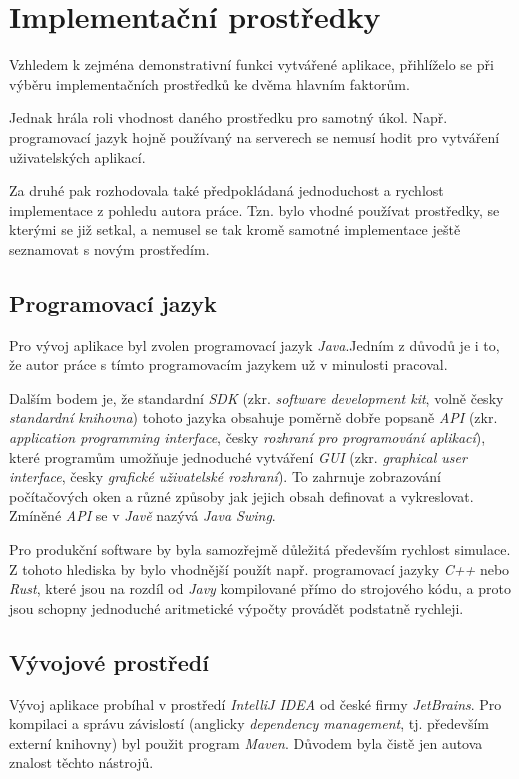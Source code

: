 \section{Implementační prostředky}

Vzhledem k zejména demonstrativní funkci vytvářené aplikace, přihlíželo se při výběru implementačních prostředků ke dvěma hlavním faktorům.

Jednak hrála roli vhodnost daného prostředku pro samotný úkol. Např. programovací jazyk hojně používaný na serverech se nemusí hodit pro vytváření uživatelských aplikací.

Za druhé pak rozhodovala také předpokládaná jednoduchost a rychlost implementace z pohledu autora práce. Tzn. bylo vhodné používat prostředky, se kterými se již setkal, a nemusel se tak kromě samotné implementace ještě seznamovat s novým prostředím.

\subsection{Programovací jazyk}

Pro vývoj aplikace byl zvolen programovací jazyk \emph{Java}.\src Jedním z důvodů je i to, že autor práce s tímto programovacím jazykem už v minulosti pracoval.

Dalším bodem je, že standardní \emph{SDK} (zkr. \emph{software development kit}, volně česky \emph{standardní knihovna}) tohoto jazyka obsahuje poměrně dobře popsaně \emph{API} (zkr. \emph{application programming interface}, česky \emph{rozhraní pro programování aplikací}), které programům umožňuje jednoduché vytváření \emph{GUI} (zkr. \emph{graphical user interface}, česky \emph{grafické uživatelské rozhraní}). To zahrnuje zobrazování počítačových oken a různé způsoby jak jejich obsah definovat a vykreslovat. Zmíněné \emph{API} se v \emph{Javě} nazývá \emph{Java Swing}.\src

Pro produkční software by byla samozřejmě důležitá především rychlost simulace. Z tohoto hlediska by bylo vhodnější použít např. programovací jazyky \emph{C++} nebo \emph{Rust}, které jsou na rozdíl od \emph{Javy} kompilované přímo do strojového kódu, a proto jsou schopny jednoduché aritmetické výpočty provádět podstatně rychleji.

\subsection{Vývojové prostředí}

Vývoj aplikace probíhal v prostředí \emph{IntelliJ IDEA} od české firmy \emph{JetBrains}. Pro kompilaci a správu závislostí (anglicky \emph{dependency management}, tj. především externí knihovny) byl použit program \emph{Maven}. Důvodem byla čistě jen autova znalost těchto nástrojů. 
